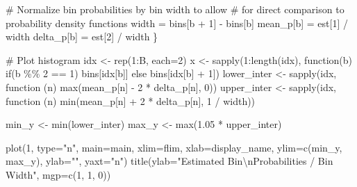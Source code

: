 \documentclass[
  letterpaper,
  DIV=11,
  numbers=noendperiod]{scrartcl}
\newenvironment{Shaded}{\begin{snugshade}}{\end{snugshade}}
\newcommand{\BuiltInTok}[1]{\textcolor[rgb]{0.00,0.23,0.31}{#1}}
\newcommand{\CharTok}[1]{\textcolor[rgb]{0.13,0.47,0.30}{#1}}
\newcommand{\CommentTok}[1]{\textcolor[rgb]{0.37,0.37,0.37}{#1}}
\newcommand{\ControlFlowTok}[1]{\textcolor[rgb]{0.00,0.23,0.31}{#1}}
\newcommand{\DecValTok}[1]{\textcolor[rgb]{0.68,0.00,0.00}{#1}}
\newcommand{\FloatTok}[1]{\textcolor[rgb]{0.68,0.00,0.00}{#1}}
\newcommand{\NormalTok}[1]{\textcolor[rgb]{0.00,0.23,0.31}{#1}}
\newcommand{\OperatorTok}[1]{\textcolor[rgb]{0.37,0.37,0.37}{#1}}
\newcommand{\StringTok}[1]{\textcolor[rgb]{0.13,0.47,0.30}{#1}}
\begin{document}
\begin{Shaded}
\begin{Highlighting}[]
    \CommentTok{\# Normalize bin probabilities by bin width to allow}
    \CommentTok{\# for direct comparison to probability density functions}
\NormalTok{    width }\OperatorTok{=}\NormalTok{ bins[b }\OperatorTok{+} \DecValTok{1}\NormalTok{] }\OperatorTok{{-}}\NormalTok{ bins[b]}
\NormalTok{    mean\_p[b] }\OperatorTok{=}\NormalTok{ est[}\DecValTok{1}\NormalTok{] }\OperatorTok{/}\NormalTok{ width}
\NormalTok{    delta\_p[b] }\OperatorTok{=}\NormalTok{ est[}\DecValTok{2}\NormalTok{] }\OperatorTok{/}\NormalTok{ width}
\NormalTok{  \}}
  
  \CommentTok{\# Plot histogram}
\NormalTok{  idx }\OperatorTok{\textless{}{-}}\NormalTok{ rep(}\DecValTok{1}\NormalTok{:B, each}\OperatorTok{=}\DecValTok{2}\NormalTok{)}
\NormalTok{  x }\OperatorTok{\textless{}{-}}\NormalTok{ sapply(}\DecValTok{1}\NormalTok{:length(idx), function(b) }\ControlFlowTok{if}\NormalTok{(b }\OperatorTok{\%\%} \DecValTok{2} \OperatorTok{==} \DecValTok{1}\NormalTok{) bins[idx[b]]}
              \ControlFlowTok{else}\NormalTok{ bins[idx[b] }\OperatorTok{+} \DecValTok{1}\NormalTok{])}
\NormalTok{  lower\_inter }\OperatorTok{\textless{}{-}}\NormalTok{ sapply(idx, function (n)}
    \BuiltInTok{max}\NormalTok{(mean\_p[n] }\OperatorTok{{-}} \DecValTok{2} \OperatorTok{*}\NormalTok{ delta\_p[n], }\DecValTok{0}\NormalTok{))}
\NormalTok{  upper\_inter }\OperatorTok{\textless{}{-}}\NormalTok{ sapply(idx, function (n)}
    \BuiltInTok{min}\NormalTok{(mean\_p[n] }\OperatorTok{+} \DecValTok{2} \OperatorTok{*}\NormalTok{ delta\_p[n], }\DecValTok{1} \OperatorTok{/}\NormalTok{ width))}
  
\NormalTok{  min\_y }\OperatorTok{\textless{}{-}} \BuiltInTok{min}\NormalTok{(lower\_inter)}
\NormalTok{  max\_y }\OperatorTok{\textless{}{-}} \BuiltInTok{max}\NormalTok{(}\FloatTok{1.05} \OperatorTok{*}\NormalTok{ upper\_inter)}
  
\NormalTok{  plot(}\DecValTok{1}\NormalTok{, }\BuiltInTok{type}\OperatorTok{=}\StringTok{"n"}\NormalTok{, main}\OperatorTok{=}\NormalTok{main,}
\NormalTok{       xlim}\OperatorTok{=}\NormalTok{flim, xlab}\OperatorTok{=}\NormalTok{display\_name,}
\NormalTok{       ylim}\OperatorTok{=}\NormalTok{c(min\_y, max\_y), ylab}\OperatorTok{=}\StringTok{""}\NormalTok{, yaxt}\OperatorTok{=}\StringTok{"n"}\NormalTok{)}
\NormalTok{  title(ylab}\OperatorTok{=}\StringTok{"Estimated Bin}\CharTok{\textbackslash{}n}\StringTok{Probabilities / Bin Width"}\NormalTok{, mgp}\OperatorTok{=}\NormalTok{c(}\DecValTok{1}\NormalTok{, }\DecValTok{1}\NormalTok{, }\DecValTok{0}\NormalTok{))}
  

\end{Highlighting}
\end{Shaded}
\end{document}
